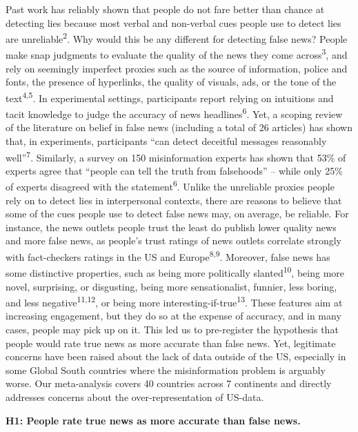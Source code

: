 \documentclass[
  man]{apa6}
\begin{document}
Past work has reliably shown that people do not fare better than chance at detecting lies because most verbal and non-verbal cues people use to detect lies are unreliable\textsuperscript{2}. Why would this be any different for detecting false news? People make snap judgments to evaluate the quality of the news they come across\textsuperscript{3}, and rely on seemingly imperfect proxies such as the source of information, police and fonts, the presence of hyperlinks, the quality of visuals, ads, or the tone of the text\textsuperscript{4,5}. In experimental settings, participants report relying on intuitions and tacit knowledge to judge the accuracy of news headlines\textsuperscript{6}. Yet, a scoping review of the literature on belief in false news (including a total of 26 articles) has shown that, in experiments, participants ``can detect deceitful messages reasonably well''\textsuperscript{7}. Similarly, a survey on 150 misinformation experts has shown that 53\% of experts agree that ``people can tell the truth from falsehoods'' -- while only 25\% of experts disagreed with the statement\textsuperscript{6}. Unlike the unreliable proxies people rely on to detect lies in interpersonal contexts, there are reasons to believe that some of the cues people use to detect false news may, on average, be reliable. For instance, the news outlets people trust the least do publish lower quality news and more false news, as people's trust ratings of news outlets correlate strongly with fact-checkers ratings in the US and Europe\textsuperscript{8,9}. Moreover, false news has some distinctive properties, such as being more politically slanted\textsuperscript{10}, being more novel, surprising, or disgusting, being more sensationalist, funnier, less boring, and less negative\textsuperscript{11,12}, or being more interesting-if-true\textsuperscript{13}. These features aim at increasing engagement, but they do so at the expense of accuracy, and in many cases, people may pick up on it. This led us to pre-register the hypothesis that people would rate true news as more accurate than false news. Yet, legitimate concerns have been raised about the lack of data outside of the US, especially in some Global South countries where the misinformation problem is arguably worse. Our meta-analysis covers 40 countries across 7 continents and directly addresses concerns about the over-representation of US-data.

\textbf{H1: People rate true news as more accurate than false news.}
\end{document}
